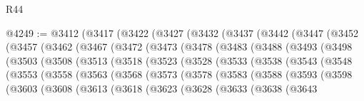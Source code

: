 \begin{lexlean}{R44}
\begin{coremodule}
{@4249 := @3412
    (@3417
      (@3422
        (@3427
          (@3432
            (@3437
              (@3442
                (@3447
                  (@3452
                    (@3457
                      (@3462
                        (@3467
                          (@3472
                            (@3473
                              (@3478
                                (@3483
                                  (@3488
                                    (@3493
                                      (@3498
                                        (@3503
                                          (@3508
                                            (@3513
                                              (@3518
                                                (@3523
                                                  (@3528
                                                    (@3533
                                                      (@3538
                                                        (@3543
                                                          (@3548
                                                            (@3553
                                                              (@3558
                                                                (@3563
                                                                  (@3568
                                                                    (@3573
                                                                      (@3578
                                                                        (@3583
                                                                          (@3588
                                                                            (@3593
                                                                              (@3598
                                                                                (@3603
                                                                                  (@3608
                                                                                    (@3613
                                                                                      (@3618
                                                                                        (@3623
                                                                                          (@3628
                                                                                            (@3633
                                                                                              (@3638
                                                                                                (@3643
}
\end{coremodule}
\end{lexlean}
